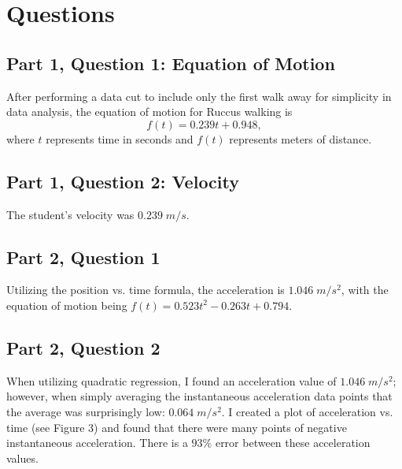 \documentclass[hidelinks, 12pt, letterpaper]{article}
\begin{document}
\section{Questions}
\subsection{Part 1, Question 1: Equation of Motion} 
After performing a data cut to include only the first walk away for 
simplicity in data analysis, the equation of motion for Ruccus walking
is 
\begin{equation}
    f(t) = 0.239t + 0.948,
\end{equation}
where 
$t$ represents time in seconds and $f(t)$ represents meters of distance.
\subsection{Part 1, Question 2: Velocity}
The student's velocity was $0.239 \; m/s$.

\subsection{Part 2, Question 1}
Utilizing the position vs. time formula, the acceleration is 
$1.046 \; m/s^{2}$, with the equation of motion being 
$f(t) = 0.523t^{2} - 0.263t + 0.794 $.

\subsection{Part 2, Question 2}
When utilizing quadratic regression,
I found an acceleration value of $1.046\; m/s^{2}$;
however, when simply averaging the instantaneous acceleration
data points that the average was surprisingly low: 
$0.064 \; m/s^2$.
I created a plot of acceleration vs. time (see Figure 3)
and found that there were many points of 
negative instantaneous acceleration.
There is a $93\%$ error between these acceleration values.
\end{document}
